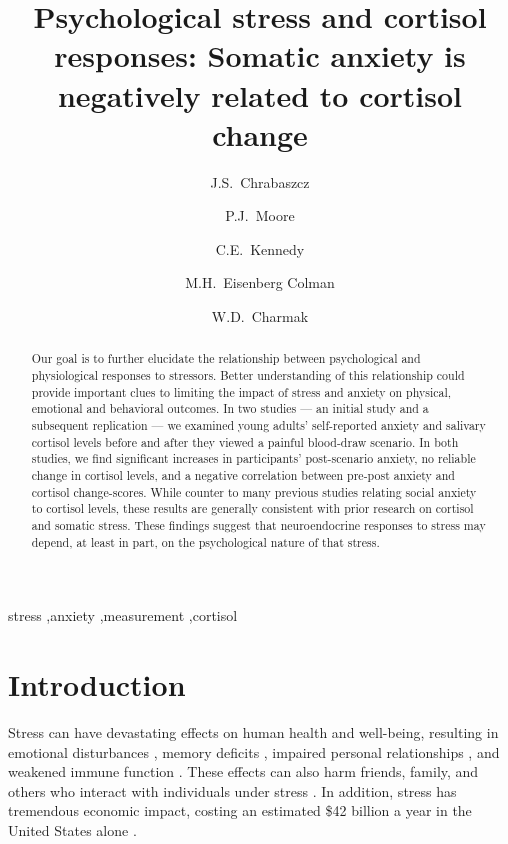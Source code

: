 \documentclass[review]{elsarticle}\usepackage[]{graphicx}\usepackage[]{color}
\title{Psychological stress and cortisol responses: Somatic anxiety is negatively related to cortisol change}
\author[jsc]{J.S.~Chrabaszcz\corref{cor1}}
\author[pjm]{P.J.~Moore}
\author[ck]{C.E.~Kennedy}
\author[me]{M.H.~Eisenberg Colman}
\author[wc]{W.D.~Charmak}
\begin{document}
\maketitle



\begin{abstract}

Our goal is to further elucidate the relationship between psychological and physiological responses to stressors.
Better understanding of this relationship could provide important clues to limiting the impact of stress and anxiety on physical, emotional and behavioral outcomes.
In two studies --- an initial study and a subsequent replication --- we examined young adults' self-reported anxiety and salivary cortisol levels  before and after they viewed a painful blood-draw scenario.
In both studies, we find significant increases in participants' post-scenario anxiety, no reliable change in cortisol levels, and a negative correlation between pre-post anxiety and cortisol change-scores.
While counter to many previous studies relating social anxiety to cortisol levels, these results are generally consistent with prior research on cortisol and somatic stress.
These findings suggest that neuroendocrine responses to stress may depend, at least in part, on the psychological nature of that stress.

\end{abstract}

\begin{keyword}
stress \sep anxiety \sep measurement \sep cortisol
\end{keyword}


\section*{Introduction}
\label{sec:introduction}

Stress can have devastating effects on human health and well-being, resulting in emotional disturbances \cite{almeida1998everyday}, memory deficits \cite{vedhara2000acute}, impaired personal relationships \cite{gruber2003long}, and weakened immune function \cite{o1990stress}.
These effects can also harm friends, family, and others who interact with individuals under stress \cite{mulia2008stress}.
In addition, stress has tremendous economic impact, costing an estimated \$42 billion a year in the United States alone \cite{greenberg1999economic}.
\end{document}
